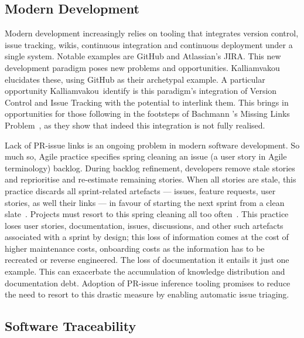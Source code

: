 \subsection{Modern Development}
\label{chapter:literature:sec:am_rel_work:modern_dev}

Modern development increasingly relies on tooling that integrates version
control, issue tracking, wikis, continuous integration and continuous deployment
under a single system. Notable examples are GitHub and Atlassian's JIRA. This
new development paradigm poses new problems and opportunities. Kalliamvakou
\etal~\cite{Kalliamvakou2014} elucidates these, using GitHub as their archetypal
example. A particular opportunity Kalliamvakou~\etal identify is this paradigm's
integration of Version Control and Issue Tracking with the potential to
interlink them. This brings in opportunities for those following in the
footsteps of Bachmann \etal's Missing Links Problem~\cite{MissingLinks}, as they
show that indeed this integration is not fully realised.

Lack of PR-issue links is an ongoing problem in modern software development.  So
much so, Agile practice specifies spring cleaning an issue (a user story in
Agile terminology) backlog. During backlog refinement, developers remove stale
stories and reprioritise and re-estimate remaining stories. When all stories are
stale, this practice discards all sprint-related artefacts --- issues, feature
requests, user stories, as well their links --- in favour of starting the next
sprint from a clean slate~\cite{BacklogRefinement}. Projects must resort to this
spring cleaning all too often~\cite{laurieTrattPersonalCommunciation}. This
practice loses user stories, documentation, issues, discussions, and other such
artefacts associated with a sprint by design; this loss of information comes at
the cost of higher maintenance costs, onboarding costs \etc as the information
has to be recreated or reverse engineered. The loss of documentation it entails
it just one example. This can exacerbate the accumulation of knowledge
distribution and documentation debt. Adoption of PR-issue inference tooling
promises to reduce the need to resort to this drastic measure by enabling
automatic issue triaging.

\subsection{Software Traceability}
\label{chapter:literature:sec:am_rel_work:tracability}


